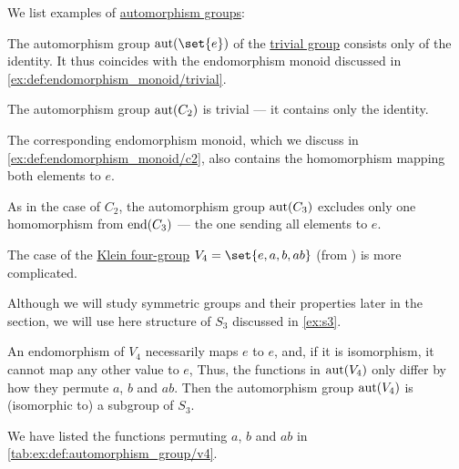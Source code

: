 \begin{example}\label{ex:def:automorphism_group}
  We list examples of \hyperref[def:automorphism_group]{automorphism groups}:
  \begin{thmenum}
     The automorphism group \( \aut(\set{ e }) \) of the \hyperref[def:group/trivial]{trivial group} consists only of the identity. It thus coincides with the endomorphism monoid discussed in \cref{ex:def:endomorphism_monoid/trivial}.

     The automorphism group \( \operatorname{aut}(C_2) \) is trivial --- it contains only the identity.

    The corresponding endomorphism monoid, which we discuss in \cref{ex:def:endomorphism_monoid/c2}, also contains the homomorphism mapping both elements to \( e \).

     As in the case of \( C_2 \), the automorphism group \( \operatorname{aut}(C_3) \) excludes only one homomorphism from \( \operatorname{end}(C_3) \) --- the one sending all elements to \( e \).

     The case of the \hyperref[def:klein_four_group]{Klein four-group} \( V_4 = \set{ e, a, b, ab } \) (from ) is more complicated.

    Although we will study symmetric groups and their properties later in the section, we will use here structure of \( S_3 \) discussed in \cref{ex:s3}.

    An endomorphism of \( V_4 \) necessarily maps \( e \) to \( e \), and, if it is isomorphism, it cannot map any other value to \( e \), Thus, the functions in \( \operatorname{aut}(V_4) \) only differ by how they permute \( a \), \( b \) and \( ab \). Then the automorphism group \( \operatorname{aut}(V_4) \) is (isomorphic to) a subgroup of \( S_3 \).

    We have listed the functions permuting \( a \), \( b \) and \( ab \) in \cref{tab:ex:def:automorphism_group/v4}.


\end{thmenum}
\end{example}
